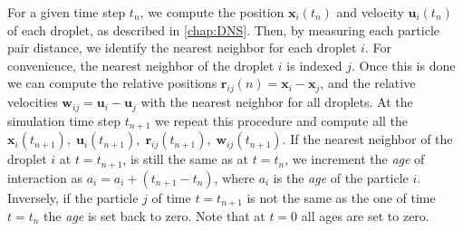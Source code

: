 For a given time step $t_n$, we compute the position $\textbf{x}_i(t_n)$ and velocity $\textbf{u}_i(t_n)$ of each droplet, as described in \ref{chap:DNS}. 
Then, by measuring each particle pair distance, we identify the nearest neighbor for each droplet $i$. 
For convenience, the nearest neighbor of the droplet $i$ is indexed $j$. 
Once this is done we can compute the relative positions $\textbf{r}_{ij}(n) =\textbf{x}_i - \textbf{x}_j$, and the relative velocities $\textbf{w}_{ij} = \textbf{u}_i - \textbf{u}_j$ with the nearest neighbor for all droplets. 
At the simulation time step $t_{n+1}$ we repeat this procedure and compute all the $\textbf{x}_i(t_{n+1}),\;\textbf{u}_i(t_{n+1}),\;\textbf{r}_{ij}(t_{n+1}),\;\textbf{w}_{ij}(t_{n+1})$. 
If the nearest neighbor of the droplet $i$ at $t = t_{n+1}$, is still the same as at $t = t_n$, we increment the \textit{age} of interaction as $a_i = a_i + (t_{n+1} - t_n)$, where $a_i$ is the \textit{age} of the particle $i$. 
Inversely, if the particle $j$ of time $t= t_{n+1}$ is not the same as the one of time $t=t_n$ the \textit{age} is set back to zero. 
Note that at $t = 0$ all ages are set to zero. 


